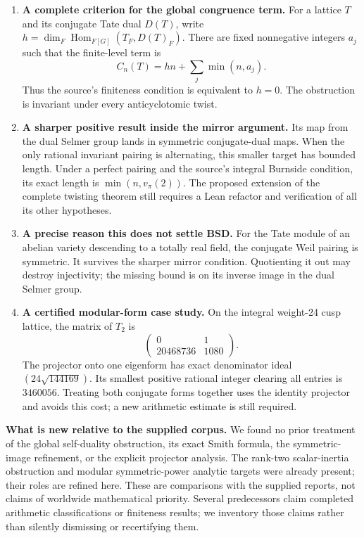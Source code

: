\documentclass[11pt,letterpaper]{article}
\theoremstyle{definition}
\theoremstyle{remark}
\newcommand{\Hom}{\operatorname{Hom}}
\begin{document}
\begin{enumerate}
\item \textbf{A complete criterion for the global congruence term.}
For a lattice $T$ and its conjugate Tate dual $D(T)$, write
$h=\dim_F\Hom_{F[G]}(T_F,D(T)_F)$. There are fixed nonnegative integers
$a_j$ such that the finite-level term is
\[
 C_n(T)=hn+\sum_j\min(n,a_j).
\]
Thus the source's finiteness condition is equivalent to $h=0$.
The obstruction is invariant under every anticyclotomic twist.

\item \textbf{A sharper positive result inside the mirror argument.}
Its map from the dual Selmer group lands in symmetric conjugate-dual maps.
When the only rational invariant pairing is alternating, this smaller target
has bounded length. Under a perfect pairing and the source's integral Burnside
condition, its exact length is $\min(n,v_\pi(2))$.
The proposed extension of the complete twisting theorem still requires a Lean
refactor and verification of all its other hypotheses.

\item \textbf{A precise reason this does not settle BSD.}
For the Tate module of an abelian variety descending to a totally real field,
the conjugate Weil pairing is symmetric. It survives the sharper mirror
condition. Quotienting it out may destroy injectivity; the missing bound is
on its inverse image in the dual Selmer group.

\item \textbf{A certified modular-form case study.}
On the integral weight-24 cusp lattice, the matrix of $T_2$ is
\[
 \begin{pmatrix}0&1\\20468736&1080\end{pmatrix}.
\]
The projector onto one eigenform has exact denominator ideal
$(24\sqrt{144169})$. Its smallest positive rational integer clearing all
entries is $3460056$. Treating both conjugate forms together uses the identity
projector and avoids this cost; a new arithmetic estimate is still required.
\end{enumerate}

\textbf{What is new relative to the supplied corpus.}
We found no prior treatment of the global self-duality obstruction, its exact
Smith formula, the symmetric-image refinement, or the explicit projector
analysis. The rank-two scalar-inertia obstruction and modular symmetric-power
analytic targets were already present; their roles are refined here.
These are comparisons with the supplied reports, not claims of worldwide
mathematical priority. Several predecessors claim completed arithmetic
classifications or finiteness results; we inventory those claims rather than
silently dismissing or recertifying them.

{\small\setlength{\parskip}{0pt}\tableofcontents}
\newpage







\appendix

\clearpage

\clearpage
\begingroup\small

\endgroup
\end{document}
